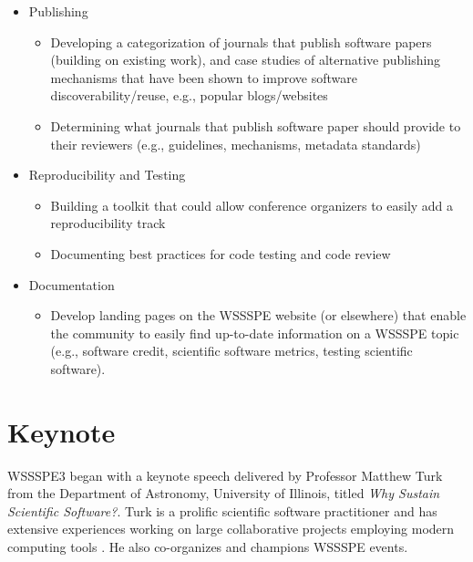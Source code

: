 \documentclass[11pt, oneside]{amsart}
\newcommand{\note}[1]{ {\textcolor{blueish}    { ***Note:      #1 }}}
\begin{document}
\begin{itemize}
\item Publishing
\begin{itemize}
\item Developing a categorization of journals that publish software papers
(building on existing work), and case studies of alternative publishing
mechanisms that have been shown to improve software discoverability/reuse, e.g.,
popular blogs/websites
\item Determining what journals that publish software paper should provide to
their reviewers (e.g., guidelines, mechanisms, metadata standards)
\end{itemize}

\item Reproducibility and Testing
\begin{itemize}
\item Building a toolkit that could allow conference organizers to easily add a
reproducibility track
\item Documenting best practices for code testing and code review
\end{itemize}

\item Documentation
\begin{itemize}
\item Develop landing pages on the WSSSPE website (or elsewhere) that enable the
community to easily find up-to-date information on a WSSSPE topic (e.g.,
software credit, scientific software metrics, testing scientific software).
\end{itemize}

\end{itemize}

\section{Keynote}\label{sec:keynote}

WSSSPE3 began with a keynote speech delivered by Professor Matthew Turk from the
Department of Astronomy, University of Illinois, titled \emph{Why Sustain
Scientific Software?}. Turk is a prolific scientific software practitioner and
has extensive experiences working on large collaborative projects employing
modern computing tools \cite{2011ApJS..192....9T}. He also co-organizes and
champions WSSSPE events.
\end{document}
